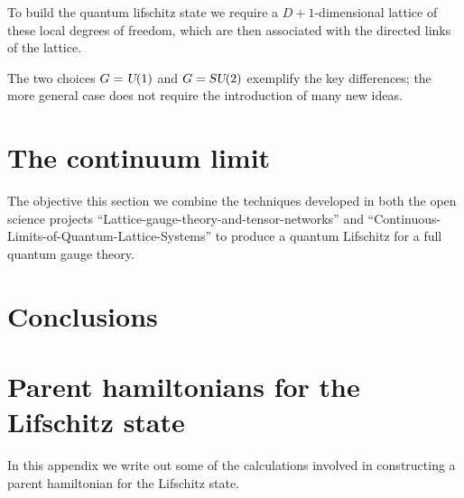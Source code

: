 \documentclass[twocolumn,lengthcheck,superscriptaddress]{revtex4-1}
\def\su2{\textsl{SU}(2)}
\def\uone{\textsl{U}(1)}
\theoremstyle{definition}
\theoremstyle{remark}
\begin{document}
To build the quantum lifschitz state we require a $D+1$-dimensional lattice of these local degrees of freedom, which are then associated with the directed links of the lattice.

The two choices $G=\uone$ and $G=\su2$ exemplify the key differences; the more general case does not require the introduction of many new ideas. 



\section{The continuum limit}
The objective this section we combine the techniques developed in both the open science projects ``Lattice-gauge-theory-and-tensor-networks'' and ``Continuous-Limits-of-Quantum-Lattice-Systems'' to produce a quantum Lifschitz for a full quantum gauge theory.

\section{Conclusions}




\widetext
\appendix
\section{Parent hamiltonians for the Lifschitz state}\label{app:metro}
In this appendix we write out some of the calculations involved in constructing a parent hamiltonian for the Lifschitz state.
\end{document}
